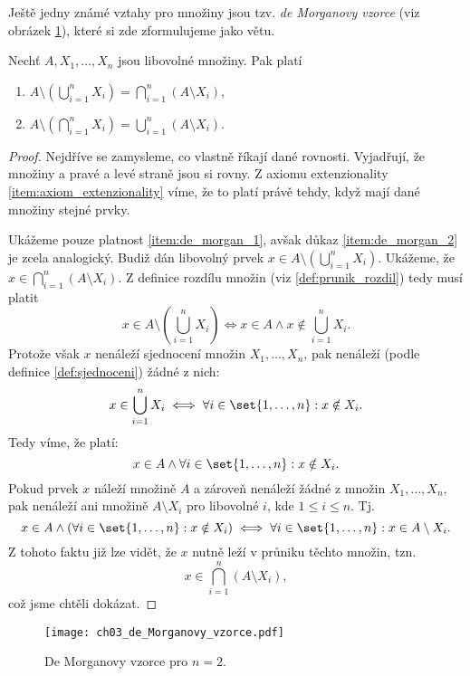 Ještě jedny známé vztahy pro množiny jsou tzv. \emph{de Morganovy vzorce} (viz obrázek \ref{fig:de_morgan}), které si zde zformulujeme jako větu.
\begin{theorem}
    Nechť $A,X_1,\dots,X_n$ jsou libovolné množiny. Pak platí
    \begin{enumerate}[label=(\roman*)]
        \item\label{item:de_morgan_1} $\displaystyle A \setminus \left(\bigcup\limits_{i=1}^{n}{X_i}\right)=\bigcap\limits_{i=1}^{n}{(A \setminus X_i)}$,
        \item\label{item:de_morgan_2} $\displaystyle A \setminus \left(\bigcap\limits_{i=1}^{n}{X_i}\right)=\bigcup\limits_{i=1}^{n}{(A \setminus X_i)}$.
    \end{enumerate}
\end{theorem}
\begin{proof}
    Nejdříve se zamysleme, co vlastně říkají dané rovnosti. Vyjadřují, že množiny a pravé a levé straně jsou si rovny. Z axiomu extenzionality \ref{item:axiom_extenzionality} víme, že to platí právě tehdy, když mají dané množiny stejné prvky.\par
    Ukážeme pouze platnost \ref{item:de_morgan_1}, avšak důkaz \ref{item:de_morgan_2} je zcela analogický. Budiž dán libovolný prvek $x\in A \setminus \left(\bigcup_{i=1}^{n}{X_i}\right)$. Ukážeme, že $x\in\bigcap_{i=1}^{n}{(A \setminus X_i)}$. Z definice rozdílu množin (viz \ref{def:prunik_rozdil}) tedy musí platit
    \begin{equation*}
        x\in A \setminus \left(\bigcup\limits_{i=1}^{n}{X_i}\right)\iff x\in A \land x\notin \bigcup\limits_{i=1}^{n}{X_i}.
    \end{equation*}
    Protože však $x$ nenáleží sjednocení množin $X_1,\dots,X_n$, pak nenáleží (podle definice \ref{def:sjednoceni}) žádné z nich:
    \begin{equation*}
        x\in\bigcup\limits_{i=1}^{n}{X_i}\iff\forall i\in\set{1,\dots,n}: x\notin X_i.
    \end{equation*}
    Tedy víme, že platí:
    \begin{equation*}
        x\in A \land \forall i\in\set{1,\dots,n}: x\notin X_i.
    \end{equation*}
    Pokud prvek $x$ náleží množině $A$ a zároveň nenáleží žádné z množin $X_1,\dots,X_n$, pak nenáleží ani množině $A\setminus X_i$ pro libovolné $i$, kde $1\leq i\leq n$. Tj.
    \begin{equation*}
        x\in A \land (\forall i\in\set{1,\dots,n}: x\notin X_i)\iff \forall i\in\set{1,\dots,n}: x\in A\setminus X_i.
    \end{equation*}
    Z tohoto faktu již lze vidět, že $x$ nutně leží v průniku těchto množin, tzn.
    \begin{equation*}
        x\in\bigcap\limits_{i=1}^{n}{(A \setminus X_i)},
    \end{equation*} 
    což jsme chtěli dokázat.
\end{proof}
\begin{figure}[H]
	\centering
	\texttt{[image: ch03\_de\_Morganovy\_vzorce.pdf]}
    \caption{De Morganovy vzorce pro $n=2$.}
    \label{fig:de_morgan}
\end{figure}